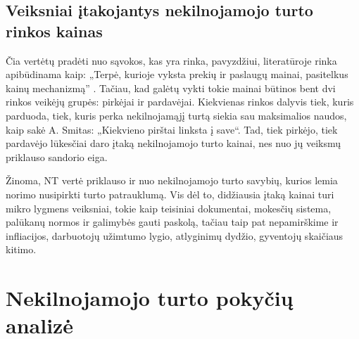 \documentclass[11pt, titlepage]{article}
\begin{document}
\subsection{Veiksniai įtakojantys nekilnojamojo turto rinkos kainas}
Čia vertėtų pradėti nuo sąvokos, kas yra rinka, pavyzdžiui, literatūroje rinka apibūdinama kaip: „Terpė, kurioje vyksta prekių ir paslaugų mainai, pasitelkus kainų mechanizmą” \parencite{tupenaite2009nekilnojamojo}. Tačiau, kad galėtų vykti tokie mainai būtinos bent dvi rinkos veikėjų grupės: pirkėjai ir pardavėjai. Kiekvienas rinkos dalyvis tiek, kuris parduoda, tiek, kuris perka nekilnojamąjį turtą siekia sau maksimalios naudos, kaip sakė A. Smitas: „Kiekvieno pirštai linksta į save“.  Tad, tiek pirkėjo, tiek pardavėjo lūkesčiai daro įtaką nekilnojamojo turto kainai, nes nuo jų veiksmų priklauso sandorio eiga. 
\par
Žinoma, NT vertė priklauso ir nuo nekilnojamojo turto savybių, kurios lemia norimo nusipirkti turto patrauklumą. Vis dėl to, didžiausia įtaką kainai turi mikro lygmens veiksniai, tokie kaip teisiniai dokumentai, mokesčių sistema, palūkanų normos ir galimybės gauti paskolą, tačiau taip pat nepamirškime ir infliacijos, darbuotojų užimtumo lygio, atlyginimų dydžio, gyventojų skaičiaus kitimo. 
\section{Nekilnojamojo turto pokyčių analizė}
\end{document}
